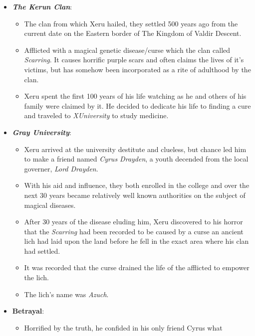 \documentclass[12pt]{article}
\begin{document}
  \begin{itemize}
    \item \textbf{\textit{The Kerun Clan}}:
      \begin{itemize}
        \item The clan from which Xeru hailed, they settled 500 years ago from
          the current date on the Eastern border of The Kingdom of Valdir
          Descent.
        \item Afflicted with a magical genetic disease/curse which the clan
          called \textit{Scarring}. It causes horrific purple scars and often
          claims the lives of it's victims, but has somehow been incorporated as
          a rite of adulthood by the clan.
        \item Xeru spent the first 100 years of his life watching as he and
          others of his family were claimed by it. He decided to dedicate his
          life to finding a cure and traveled to \textit{XUniversity} to study
          medicine.
      \end{itemize}
    \item \textbf{\textit{Gray University}}: 
      \begin{itemize}
        \item Xeru arrived at the university destitute and clueless, but chance led
          him to make a friend named \textit{Cyrus Drayden}, a youth decended from
          the local governer, \textit{Lord Drayden}.
        \item With his aid and influence, they both enrolled in the college and
          over the next 30 years became relatively well known authorities on the
          subject of magical diseases.
        \item After 30 years of the disease eluding him, Xeru discovered to his
          horror that the \textit{Scarring} had been recorded to be caused by
          a curse an ancient lich had laid upon the land before he fell in the
          exact area where his clan had settled.
        \item It was recorded that the curse drained the life of the afflicted
          to empower the lich.
        \item The lich's name was \textit{Azuch}.
      \end{itemize}
    \item \textbf{Betrayal}:
      \begin{itemize}
        \item Horrified by the truth, he confided in his only friend Cyrus what

\end{itemize}
\end{itemize}
\end{document}

